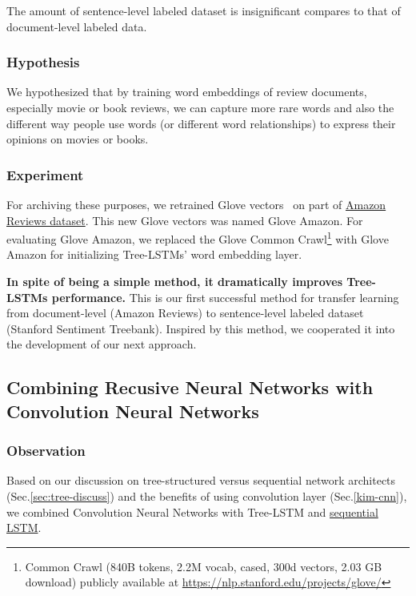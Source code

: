 The amount of sentence-level labeled dataset is insignificant compares to that of  document-level labeled data.
\subsubsection{Hypothesis}
We hypothesized that by training word embeddings of review documents, especially movie or book reviews, we can capture more rare words and also the different way people use words (or different word relationships) to express their opinions on movies or books.


\subsubsection{Experiment}
For archiving these purposes, we retrained Glove vectors~\cite{glove} on part of  \hyperref[sec:amazon]{Amazon Reviews dataset}.
This new Glove vectors was named Glove Amazon.
For evaluating Glove Amazon, we replaced the Glove Common Crawl\footnote{Common Crawl (840B tokens, 2.2M vocab, cased, 300d vectors, 2.03 GB download) publicly available at \url{https://nlp.stanford.edu/projects/glove/}} with Glove Amazon for initializing Tree-LSTMs' word embedding layer.

\textbf{In spite of being a simple method, it dramatically improves Tree-LSTMs performance.}
This is our first successful method for transfer learning from document-level (Amazon Reviews) to sentence-level labeled dataset (Stanford Sentiment Treebank).
Inspired by this method, we cooperated it into the development of our next approach.

\subsection{Combining Recusive Neural Networks with Convolution Neural Networks}

\subsubsection{Observation}
Based on our discussion on tree-structured versus sequential network architects (Sec.\ref{sec:tree-discuss}) and the benefits of using convolution layer (Sec.\ref{kim-cnn}), we combined Convolution Neural Networks with Tree-LSTM and \hyperref[sec:lstm]{sequential LSTM}.


